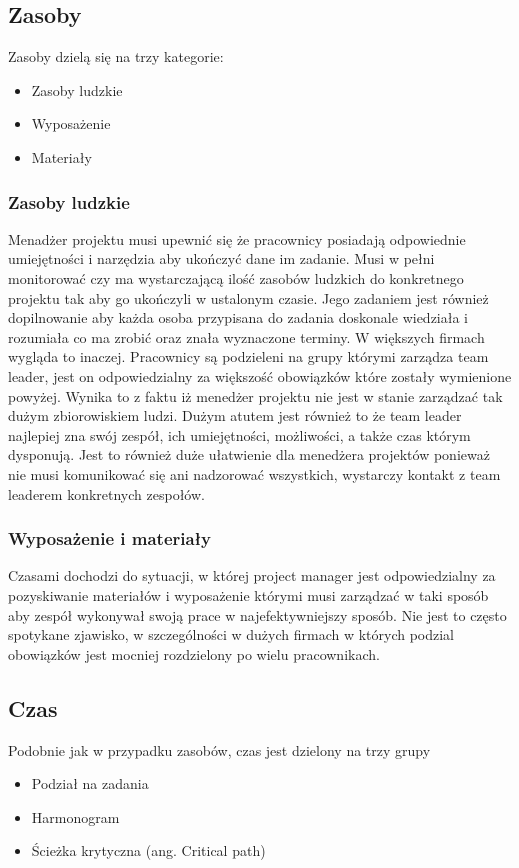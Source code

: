 \documentclass[oneside,polski,logo]{amuthesis}
\begin{document}
\subsection {Zasoby}
Zasoby dzielą się na trzy kategorie:
\begin{itemize}
	\item Zasoby ludzkie
	\item Wyposażenie
	\item Materiały
\end{itemize}
\subsubsection {Zasoby ludzkie}

Menadżer projektu musi upewnić się że pracownicy posiadają odpowiednie umiejętności i narzędzia aby ukończyć dane im zadanie. Musi w pełni monitorować czy ma wystarczającą ilość zasobów ludzkich do konkretnego projektu tak aby go ukończyli w ustalonym czasie. Jego zadaniem jest również dopilnowanie aby każda osoba przypisana do zadania doskonale wiedziała i rozumiała co ma zrobić oraz znała wyznaczone terminy. W większych firmach wygląda to inaczej. Pracownicy są podzieleni na grupy którymi zarządza team leader, jest on odpowiedzialny za większość obowiązków które zostały wymienione powyżej. Wynika to z faktu iż menedżer projektu nie jest w stanie zarządzać tak dużym zbiorowiskiem ludzi. Dużym atutem jest również to że team leader najlepiej zna swój zespół, ich umiejętności, możliwości, a także czas którym dysponują. Jest to również duże ułatwienie dla menedżera projektów ponieważ nie musi komunikować się ani nadzorować wszystkich, wystarczy kontakt z team leaderem konkretnych zespołów. 

\subsubsection {Wyposażenie i materiały}
Czasami dochodzi do sytuacji, w której project manager jest odpowiedzialny za pozyskiwanie materiałów i wyposażenie którymi musi zarządzać w taki sposób aby zespół wykonywał swoją prace w najefektywniejszy sposób. Nie jest to często spotykane zjawisko, w szczególności w dużych firmach w których podzial obowiązków jest mocniej rozdzielony po wielu pracownikach.

\subsection {Czas}
Podobnie jak w przypadku zasobów, czas jest dzielony na trzy grupy
\begin{itemize}
	\item Podział na zadania
	\item Harmonogram
	\item Ścieżka krytyczna (ang. Critical path)
\end{itemize}
\end{document}
